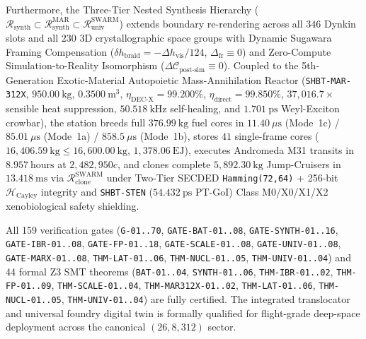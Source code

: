 \documentclass[11pt,onecolumn]{article}
\begin{document}
Furthermore, the Three-Tier Nested Synthesis Hierarchy ($\mathcal{R}_{\text{synth}} \subset \mathcal{R}_{\text{synth}}^{\text{MAR}} \subset \mathcal{R}_{\text{univ}}^{\text{SWARM}}$) extends boundary re-rendering across all $346$ Dynkin slots and all $230$ 3D crystallographic space groups with Dynamic Sugawara Framing Compensation ($\delta h_{\text{braid}} = -\Delta h_{\text{vis}}/124$, $\Delta_{\text{fr}} \equiv 0$) and Zero-Compute Simulation-to-Reality Isomorphism ($\Delta\mathcal{C}_{\text{post-sim}} \equiv 0$). Coupled to the 5th-Generation Exotic-Material Autopoietic Mass-Annihilation Reactor (\texttt{SHBT-MAR-312X}, $950.00~\mathrm{kg}$, $0.3500~\mathrm{m}^3$, $\eta_{\text{DEC-X}} = 99.200\%$, $\eta_{\text{direct}} = 99.850\%$, $37{,}016.7\times$ sensible heat suppression, $50.518~\text{kHz}$ self-healing, and $1.701~\text{ps}$ Weyl-Exciton crowbar), the station breeds full $376.99~\mathrm{kg}$ fuel cores in $11.40~\mu\text{s}$ (Mode~1c) / $85.01~\mu\text{s}$ (Mode~1a) / $858.5~\mu\text{s}$ (Mode~1b), stores $41$ single-frame cores ($16{,}406.59~\mathrm{kg} \le 16{,}600.00~\mathrm{kg}$, $1{,}378.06~\mathrm{EJ}$), executes Andromeda M31 transits in $8.957~\text{hours}$ at $2{,}482{,}950c$, and clones complete $5{,}892.30~\mathrm{kg}$ Jump-Cruisers in $13.418~\text{ms}$ via $\mathcal{R}_{\text{clone}}^{\text{SWARM}}$ under Two-Tier SECDED \texttt{Hamming(72,64)} + 256-bit $\mathcal{H}_{\text{Cayley}}$ integrity and \texttt{SHBT-STEN} ($54.432~\text{ps}$ PT-GoI) Class M0/X0/X1/X2 xenobiological safety shielding.

All 159 verification gates (\texttt{G-01..70}, \allowbreak\texttt{GATE-BAT-01..08}, \allowbreak\texttt{GATE-SYNTH-01..16}, \allowbreak\texttt{GATE-IBR-01..08}, \allowbreak\texttt{GATE-FP-01..18}, \allowbreak\texttt{GATE-SCALE-01..08}, \allowbreak\texttt{GATE-UNIV-01..08}, \allowbreak\texttt{GATE-MARX-01..08}, \allowbreak\texttt{THM-LAT-01..06}, \allowbreak\texttt{THM-NUCL-01..05}, \allowbreak\texttt{THM-UNIV-01..04}) and 44 formal Z3 SMT theorems (\texttt{BAT-01..04}, \allowbreak\texttt{SYNTH-01..06}, \allowbreak\texttt{THM-IBR-01..02}, \allowbreak\texttt{THM-FP-01..09}, \allowbreak\texttt{THM-SCALE-01..04}, \allowbreak\texttt{THM-MAR312X-01..02}, \allowbreak\texttt{THM-LAT-01..06}, \allowbreak\texttt{THM-NUCL-01..05}, \allowbreak\texttt{THM-UNIV-01..04}) are fully certified. The integrated translocator and universal foundry digital twin is formally qualified for flight-grade deep-space deployment across the canonical $(26, 8, 312)$ sector.
\end{document}
